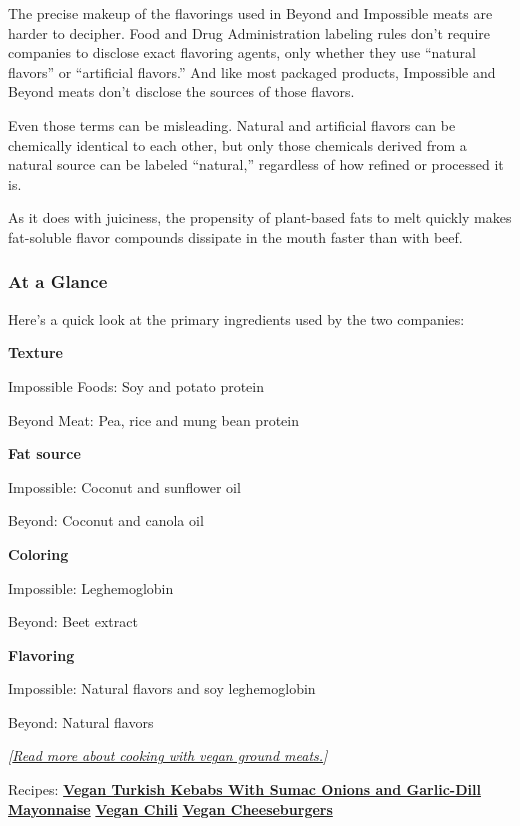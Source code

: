 The precise makeup of the flavorings used in Beyond and Impossible meats
are harder to decipher. Food and Drug Administration labeling rules
don't require companies to disclose exact flavoring agents, only whether
they use ``natural flavors'' or ``artificial flavors.'' And like most
packaged products, Impossible and Beyond meats don't disclose the
sources of those flavors.

Even those terms can be misleading. Natural and artificial flavors can
be chemically identical to each other, but only those chemicals derived
from a natural source can be labeled ``natural,'' regardless of how
refined or processed it is.

As it does with juiciness, the propensity of plant-based fats to melt
quickly makes fat-soluble flavor compounds dissipate in the mouth faster
than with beef.

\hypertarget{at-a-glance}{%
\subsubsection{At a Glance}\label{at-a-glance}}

Here's a quick look at the primary ingredients used by the two
companies:

\textbf{Texture}

Impossible Foods: Soy and potato protein

Beyond Meat: Pea, rice and mung bean protein

\textbf{Fat source}

Impossible: Coconut and sunflower oil

Beyond: Coconut and canola oil

\textbf{Coloring}

Impossible: Leghemoglobin

Beyond: Beet extract

\textbf{Flavoring}

Impossible: Natural flavors and soy leghemoglobin

Beyond: Natural flavors

\emph{{[}}\href{https://www.nytimes3xbfgragh.onion/2020/03/03/dining/impossible-beyond-meat.html}{\emph{Read
more about cooking with vegan ground meats.}}\emph{{]}}

Recipes:
\textbf{\href{https://cooking.nytimes3xbfgragh.onion/recipes/1020865-vegan-turkish-kebabs-with-sumac-onions-and-garlic-dill-mayonnaise}{Vegan
Turkish Kebabs With Sumac Onions and Garlic-Dill Mayonnaise}} \textbar{}
\textbf{\href{https://cooking.nytimes3xbfgragh.onion/recipes/1020866-vegan-chili}{Vegan
Chili}} \textbar{}
\textbf{\href{https://cooking.nytimes3xbfgragh.onion/recipes/1020867-vegan-cheeseburgers}{Vegan
Cheeseburgers}}

